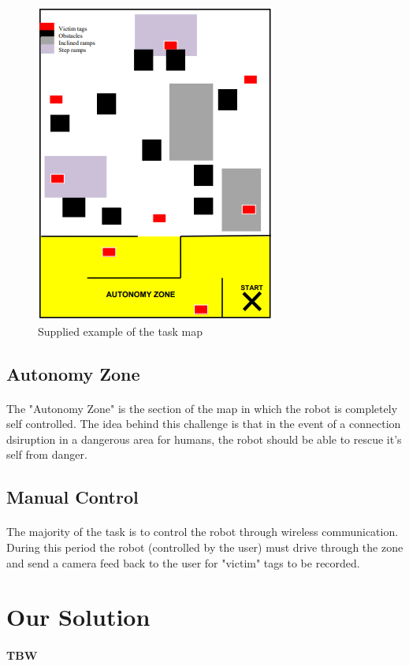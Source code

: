 \documentclass[12pt, a4paper]{article}
\begin{document}
\begin{figure}[h]
  \includegraphics{Images/AutonZone.png}
  \centering
  \caption{Supplied example of the task map}
  \label{fig:intro:map}
\end{figure}

\subsection{Autonomy Zone}
  \paragraph{}
    The "Autonomy Zone" is the section of the map in which the robot is completely self controlled. The idea behind this challenge is that in the event of a connection dsiruption in a dangerous area for humans, the robot should be able to rescue it's self from danger.

\subsection{Manual Control}
 \paragraph{}
    The majority of the task is to control the robot through wireless communication. During this period the robot (controlled by the user) must drive through the zone and send a camera feed back to the user for "victim" tags to be recorded.


\newpage

\section{Our Solution} \label{sec:Solution}
\paragraph{ TBW }
\end{document}
